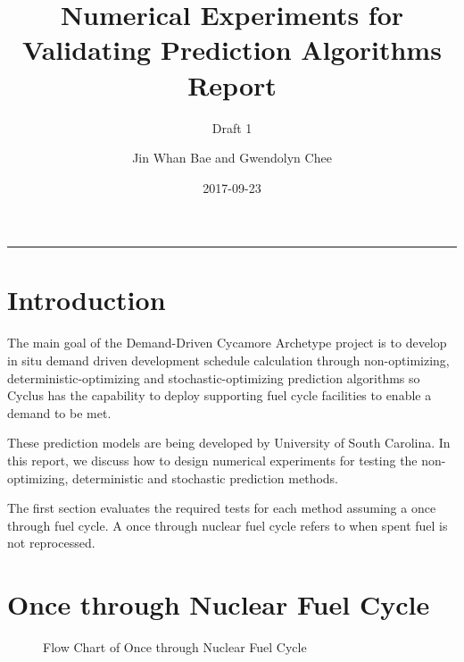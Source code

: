 \documentclass[12pt,letterpaper]{article}
\title{Numerical Experiments for Validating Prediction Algorithms Report}
\subtitle{Draft 1}
\author{Jin Whan Bae and Gwendolyn Chee}
\date{2017-09-23}
\begin{document}
	
	\maketitle
	\hrule
	\onehalfspacing
	\thispagestyle{empty}

\section*{Introduction}
The main goal of the Demand-Driven Cycamore Archetype project is to develop in situ demand driven development schedule calculation through non-optimizing, deterministic-optimizing and stochastic-optimizing prediction algorithms so Cyclus has the capability to deploy supporting fuel cycle facilities to enable a demand to be met.

These prediction models are being developed by University of South Carolina. In this report, we discuss how to design numerical experiments for testing the non-optimizing, deterministic and stochastic prediction methods. 

The first section evaluates the required tests for each method assuming a once through fuel cycle. A once through nuclear fuel cycle refers to when spent fuel is not reprocessed. 

\section{Once through Nuclear Fuel Cycle}
\begin{figure}[H]
\caption{Flow Chart of Once through Nuclear Fuel Cycle}
\end{figure}
\end{document}
